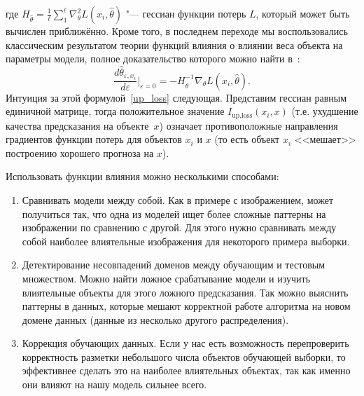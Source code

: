 \documentclass[12pt,a4paper]{article}
\begin{document}
где $H_{\hat{\theta}} = \frac{1}{\ell} \sum_1^\ell \nabla_\theta^2 L(x_i, \hat{\theta})$ "--- гессиан функции потерь $L$, который может быть вычислен приближённо. Кроме того, в последнем переходе мы воспользовались классическим результатом теории функций влияния о влиянии веса объекта на параметры модели, полное доказательство которого можно найти в~\cite{cook1982residuals}:
\[
	\frac{d \hat{\theta}_{\varepsilon, x_i}}{d \varepsilon}\Bigg|_{\varepsilon = 0} = - H_{\hat{\theta}}^{-1} \nabla_\theta L(x_i, \hat{\theta}).
\]
Интуиция за этой формулой~\ref{up_loss} следующая. Представим гессиан равным единичной матрице, тогда положительное значение $I_{\text{up}, \text{loss}} (x_i, x)$ (т.е. ухудшение качества предсказания на объекте~$x$) означает противоположные направления градиентов функции потерь для объектов $x_i$ и $x$ (то есть объект $x_i$ <<мешает>> построению хорошего прогноза на $x$).


Использовать функции влияния можно несколькими способами:
\begin{enumerate}
	\item Сравнивать модели между собой. Как в примере с изображением, может получиться так, что одна из моделей ищет более сложные паттерны на изображении по сравнению с другой. Для этого нужно сравнивать между собой наиболее влиятельные изображения для некоторого примера выборки.
	\item Детектирование несовпадений доменов между обучающим и тестовым множеством. Можно найти ложное срабатывание модели и изучить влиятельные объекты для этого ложного предсказания. Так можно выяснить паттерны в данных, которые мешают корректной работе алгоритма на новом домене данных (данные из несколько другого распределения).
	\item Коррекция обучающих данных. Если у нас есть возможность перепроверить корректность разметки небольшого числа объектов обучающей выборки, то эффективнее сделать это на наиболее влиятельных объектах, так как именно они влияют на нашу модель сильнее всего.
\end{enumerate}
\end{document}
